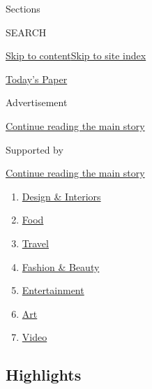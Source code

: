 Sections

SEARCH

\protect\hyperlink{site-content}{Skip to
content}\protect\hyperlink{site-index}{Skip to site index}

\href{https://myaccount.nytimes3xbfgragh.onion/auth/login?response_type=cookie\&client_id=vi}{}

\href{https://www.nytimes3xbfgragh.onion/section/todayspaper}{Today's
Paper}

Advertisement

\protect\hyperlink{after-top}{Continue reading the main story}

Supported by

\protect\hyperlink{after-sponsor}{Continue reading the main story}

\begin{enumerate}
\def\labelenumi{\arabic{enumi}.}
\tightlist
\item
  \href{/section/t-magazine/design}{Design \& Interiors}
\item
  \href{/section/t-magazine/food}{Food}
\item
  \href{/section/t-magazine/travel}{Travel}
\item
  \href{/section/t-magazine/fashion}{Fashion \& Beauty}
\item
  \href{/section/t-magazine/entertainment}{Entertainment}
\item
  \href{/section/t-magazine/art}{Art}
\item
  \href{/video/t-magazine}{Video}
\end{enumerate}

\hypertarget{highlights}{%
\subsection{Highlights}\label{highlights}}

